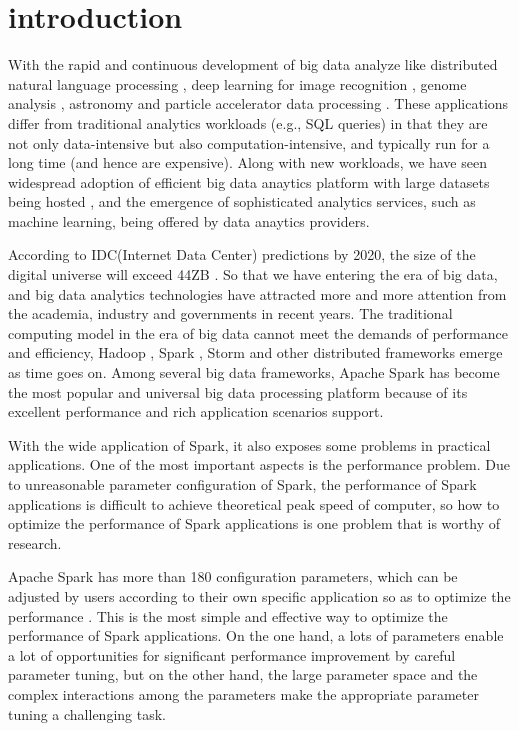 \section{introduction}
\par With the rapid and continuous development of big data analyze like distributed natural language processing \cite{brants2007large}, deep learning for image recognition \cite{dean2012Large}, genome analysis \cite{L2010cloudcomputing}, astronomy \cite{Berriman2010application} and particle accelerator data processing \cite{bird2011}. These applications differ from traditional analytics workloads (e.g., SQL queries) in that they are not only data-intensive but also computation-intensive, and typically run for a long time (and hence are expensive). Along with new workloads, we have seen widespread adoption of efficient big data anaytics platform with large datasets being hosted \cite{commoncrawlurl}, and the emergence of sophisticated analytics services, such as machine learning, being offered by data anaytics providers\cite{Machinelearningurl}.

\par According to IDC(Internet Data Center) predictions by 2020, the size of the digital universe will exceed 44ZB \cite{IDC2012}. So that we have entering the era of big data, and big data analytics technologies have attracted more and more attention from the academia, industry and governments in recent years. The traditional computing model in the era of big data cannot meet the demands of performance and efficiency, Hadoop \cite{apachehadoop}, Spark \cite{apachespark}, Storm \cite{apachestorm} and other distributed frameworks emerge as time goes on. Among several big data frameworks, Apache Spark has become the most popular and universal big data processing platform because of its excellent performance and rich application scenarios support.

\par With the wide application of Spark, it also exposes some problems in practical applications. One of the most important aspects is the performance problem. Due to unreasonable parameter configuration of Spark, the performance of Spark applications is difficult to achieve theoretical peak speed of computer, so how to optimize the performance of Spark applications is one problem that is worthy of research.

\par Apache Spark has more than 180 configuration parameters, which can be adjusted by users according to their own specific application so as to optimize the performance \cite{apachespark}. This is the most simple and effective way to optimize the performance of Spark applications. On the one hand, a lots of parameters enable a lot of opportunities for significant performance improvement by careful parameter tuning, but on the other hand, the large parameter space and the complex interactions among the parameters make the appropriate parameter tuning a challenging task.

